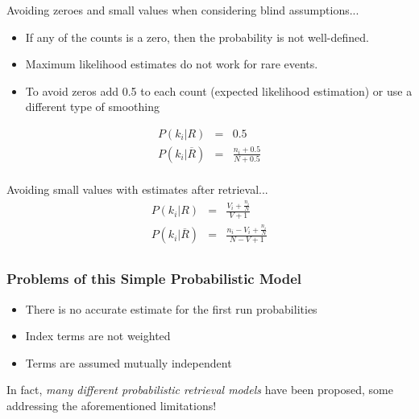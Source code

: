 \documentclass[svgnames]{beamer}
\begin{document}
\begin{frame}[allowframebreaks]
  \begin{block}{Avoiding zeroes and small values when considering blind assumptions...}
    \begin{itemize}
    \item If any of the counts is a zero, then the probability is not well-defined.
    \item Maximum likelihood estimates do not work for rare events.
    \item To avoid zeros add 0.5 to each count (expected likelihood estimation) or use a different type of smoothing
    \end{itemize}
    \begin{displaymath}
      \begin{array}{rcl}
        P(k_i|R) &=& 0.5\\
        P(k_i|\overline{R}) &=& \frac{n_i + 0.5}{N + 0.5}\\
      \end{array}
    \end{displaymath}   
  \end{block}
  
  \begin{block}{Avoiding small values with estimates after retrieval...}
    \begin{displaymath}
      \begin{array}{rcl}
        P(k_i|R) &=& \frac{V_i + \frac{n_i}{N}}{V + 1}\\
        P(k_i|\overline{R}) &=& \frac{n_i - V_i + \frac{n_i}{N}}{N - V + 1}\\
      \end{array}
    \end{displaymath}    
  \end{block}
\end{frame}


\begin{frame} \frametitle{Problems of this Simple Probabilistic Model}
  \begin{block}{}
    \begin{itemize}
    \item There is no accurate estimate for the first run probabilities
    \item Index terms are not weighted
    \item Terms are assumed mutually independent
    \end{itemize}
  \end{block}
  \begin{block}{}
    In fact, \emph{many different probabilistic retrieval models} have been proposed, some addressing the aforementioned limitations!
  \end{block}
\end{frame}
\end{document}

